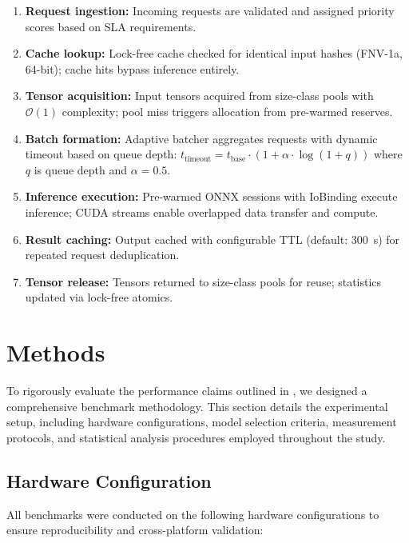\documentclass[10pt,twocolumn,a4paper]{article}
\theoremstyle{definition}
\theoremstyle{plain}
\begin{document}
\begin{enumerate}
    \item \textbf{Request ingestion:} Incoming requests are validated and assigned priority scores based on SLA requirements.
    \item \textbf{Cache lookup:} Lock-free cache checked for identical input hashes (FNV-1a, 64-bit); cache hits bypass inference entirely.
    \item \textbf{Tensor acquisition:} Input tensors acquired from size-class pools with $\mathcal{O}(1)$ complexity; pool miss triggers allocation from pre-warmed reserves.
    \item \textbf{Batch formation:} Adaptive batcher aggregates requests with dynamic timeout based on queue depth: $t_{\text{timeout}} = t_{\text{base}} \cdot (1 + \alpha \cdot \log(1 + q))$ where $q$ is queue depth and $\alpha = 0.5$.
    \item \textbf{Inference execution:} Pre-warmed ONNX sessions with IoBinding execute inference; CUDA streams enable overlapped data transfer and compute.
    \item \textbf{Result caching:} Output cached with configurable TTL (default: \SI{300}{\second}) for repeated request deduplication.
    \item \textbf{Tensor release:} Tensors returned to size-class pools for reuse; statistics updated via lock-free atomics.
\end{enumerate}

\section{Methods}
\label{sec:methods}

To rigorously evaluate the performance claims outlined in , we designed a comprehensive benchmark methodology. This section details the experimental setup, including hardware configurations, model selection criteria, measurement protocols, and statistical analysis procedures employed throughout the study.

\subsection{Hardware Configuration}

All benchmarks were conducted on the following hardware configurations to ensure reproducibility and cross-platform validation:
\end{document}
